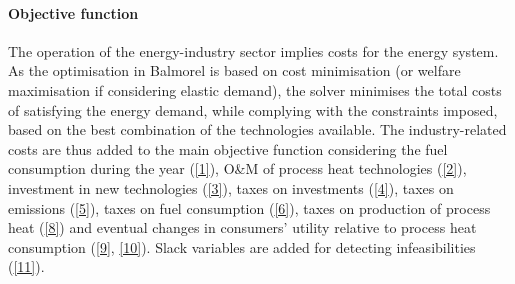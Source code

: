 \documentclass[review]{elsarticle}
\begin{document}
\paragraph{Objective function}
The operation of the energy-industry sector implies costs for the energy system. 
As the optimisation in Balmorel is based on cost minimisation (or welfare maximisation if considering elastic demand), the solver minimises the total costs of satisfying the energy demand, while complying with the constraints imposed, based on the best combination of the technologies available. 
The industry-related costs are thus added to the main objective function considering the fuel consumption during the year (\autoref{1}), O\&M of process heat technologies (\autoref{2}), investment in new technologies (\autoref{3}), taxes on investments (\autoref{4}), taxes on emissions (\autoref{5}), taxes on fuel consumption (\autoref{6}), taxes on production of process heat (\autoref{8}) and eventual changes in consumers' utility relative to process heat consumption (\autoref{9}, \autoref{10}). Slack variables are added for detecting infeasibilities (\autoref{11}). 
\end{document}
